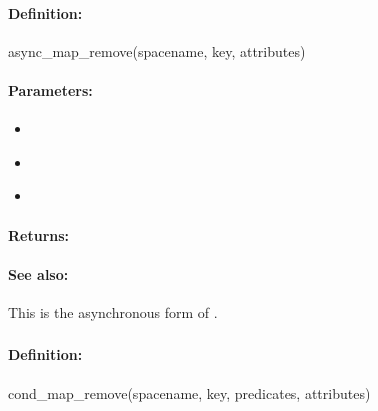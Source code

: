 \paragraph{Definition:}
\begin{rubycode}
async_map_remove(spacename, key, attributes)
\end{rubycode}

\paragraph{Parameters:}
\begin{itemize}[noitemsep]
\item {}\\

\item {}\\

\item {}\\

\end{itemize}

\paragraph{Returns:}


\paragraph{See also:}  This is the asynchronous form of .

\pagebreak
\subsubsection{}
\label{api:ruby:cond_map_remove}


\paragraph{Definition:}
\begin{rubycode}
cond_map_remove(spacename, key, predicates, attributes)
\end{rubycode}

